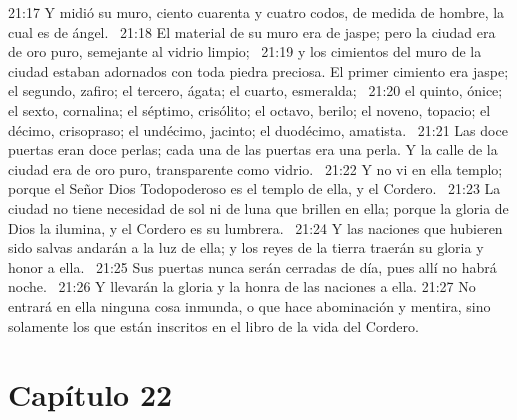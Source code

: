 21:17 Y midió su muro, ciento cuarenta y cuatro codos, de medida de hombre, la cual es de ángel.  
21:18 El material de su muro era de jaspe; pero la ciudad era de oro puro, semejante al vidrio limpio;  
21:19 y los cimientos del muro de la ciudad estaban adornados con toda piedra preciosa. El primer cimiento era jaspe; el segundo, zafiro; el tercero, ágata; el cuarto, esmeralda;  
21:20 el quinto, ónice; el sexto, cornalina; el séptimo, crisólito; el octavo, berilo; el noveno, topacio; el décimo, crisopraso; el undécimo, jacinto; el duodécimo, amatista.  
21:21 Las doce puertas eran doce perlas; cada una de las puertas era una perla. Y la calle de la ciudad era de oro puro, transparente como vidrio.  
21:22 Y no vi en ella templo; porque el Señor Dios Todopoderoso es el templo de ella, y el Cordero.  
21:23 La ciudad no tiene necesidad de sol ni de luna que brillen en ella; porque la gloria de Dios la ilumina, y el Cordero es su lumbrera.  
21:24 Y las naciones que hubieren sido salvas andarán a la luz de ella; y los reyes de la tierra traerán su gloria y honor a ella.  
21:25 Sus puertas nunca serán cerradas de día, pues allí no habrá noche.  
21:26 Y llevarán la gloria y la honra de las naciones a ella. 
21:27 No entrará en ella ninguna cosa inmunda, o que hace abominación y mentira, sino solamente los que están inscritos en el libro de la vida del Cordero.  
\section*{Capítulo 22}

